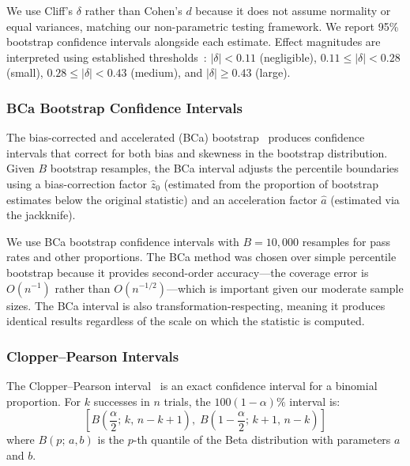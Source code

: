 \documentclass[11pt]{article}
\begin{document}
We use Cliff's $\delta$ rather than Cohen's $d$ because it does not assume
normality or equal variances, matching our non-parametric testing framework. We
report 95\% bootstrap confidence intervals alongside each estimate. Effect
magnitudes are interpreted using established thresholds~\cite{romano2006appropriate}:
$|\delta| < 0.11$ (negligible), $0.11 \leq |\delta| < 0.28$ (small),
$0.28 \leq |\delta| < 0.43$ (medium), and $|\delta| \geq 0.43$ (large).

\subsubsection{BCa Bootstrap Confidence Intervals}
\label{sec:bca_bootstrap}

The bias-corrected and accelerated (BCa) bootstrap~\cite{efron1987better}
produces confidence intervals that correct for both bias and skewness in the
bootstrap distribution. Given $B$ bootstrap resamples, the BCa interval
adjusts the percentile boundaries using a bias-correction factor $\hat{z}_0$
(estimated from the proportion of bootstrap estimates below the original
statistic) and an acceleration factor $\hat{a}$ (estimated via the jackknife).

We use BCa bootstrap confidence intervals with $B = 10{,}000$ resamples for
pass rates and other proportions. The BCa method was chosen over simple
percentile bootstrap because it provides second-order accuracy---the coverage
error is $O(n^{-1})$ rather than $O(n^{-1/2})$---which is important given our
moderate sample sizes. The BCa interval is also transformation-respecting,
meaning it produces identical results regardless of the scale on which the
statistic is computed.

\subsubsection{Clopper--Pearson Intervals}
\label{sec:clopper_pearson}

The Clopper--Pearson interval~\cite{clopper1934use} is an exact confidence
interval for a binomial proportion. For $k$ successes in $n$ trials, the
$100(1-\alpha)\%$ interval is:
\begin{equation}
  \left[B\!\left(\frac{\alpha}{2};\, k,\, n-k+1\right),\;
        B\!\left(1-\frac{\alpha}{2};\, k+1,\, n-k\right)\right]
\end{equation}
where $B(p;\, a, b)$ is the $p$-th quantile of the Beta distribution with
parameters $a$ and $b$.
\end{document}
